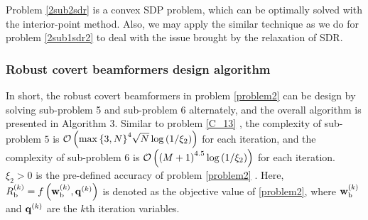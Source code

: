 \documentclass[10pt,journal,letterpaper,twocolumn,twoside]{IEEEtran} %
\begin{document}
Problem \eqref{2sub2sdr} is a convex SDP problem, which  can be optimally solved with the interior-point method.
Also, we may apply the similar technique as we do for problem  \eqref{2sub1sdr2} to deal with the issue brought by the relaxation of SDR.




\subsubsection{ {Robust covert beamformers design algorithm}}

 In short, the robust covert beamformers in problem \eqref{problem2} can be design by solving sub-problem 5 and sub-problem 6  alternately, and the  overall  algorithm  is presented in
Algorithm 3.
Similar to problem \eqref{C_13} , the complexity of sub-problem $5$
is ${\cal O}\left( {\max {{\left\{ {3,N} \right\}}^4}\sqrt {N} \log \left( {{1 \mathord{\left/
 {\vphantom {1 {{\xi _1}}}} \right.
 \kern-\nulldelimiterspace} {{\xi _2}}}} \right)} \right)$ for each iteration, and the complexity of sub-problem $6$ is ${\cal O}\left( {{{\left( {M+1}  \right)}^{4.5}}\log \left( {{1 \mathord{\left/
 {\vphantom {1 {{\xi _1}}}} \right.
 \kern-\nulldelimiterspace} {{\xi _2}}}}  \right)} \right)$
for each iteration. ${\xi _2} > 0$ is the pre-defined accuracy of problem \eqref{problem2} \cite{ZLuo10Semidefinite,Grant09cvx}.
Here, %
$R_{\rm{b}}^{\left( k \right)} = f\left( {{\bf{w}}_{\rm{b}}^{\left( k \right)},{{\bf{q}}^{\left( k \right)}}} \right)$ is denoted as  the objective value of  \eqref{problem2}, where ${{\bf{w}}_{\rm{b}}^{\left( k \right)}}$ and ${{\bf{q}}^{\left( {k } \right)}}$ are the $k$th iteration variables.
\end{document}
